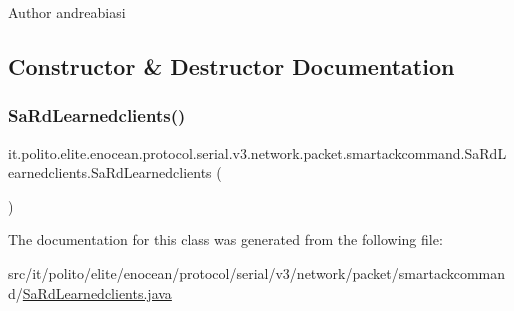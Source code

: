 \begin{DoxyAuthor}{Author}
andreabiasi 
\end{DoxyAuthor}


\subsection{Constructor \& Destructor Documentation}
\hypertarget{classit_1_1polito_1_1elite_1_1enocean_1_1protocol_1_1serial_1_1v3_1_1network_1_1packet_1_1smarta3fc26adfd93544996f2a731385cfeb74_ab4fc579aab4010d715f8e6dbd3641076}{}\label{classit_1_1polito_1_1elite_1_1enocean_1_1protocol_1_1serial_1_1v3_1_1network_1_1packet_1_1smarta3fc26adfd93544996f2a731385cfeb74_ab4fc579aab4010d715f8e6dbd3641076} 
\subsubsection{\texorpdfstring{Sa\+Rd\+Learnedclients()}{SaRdLearnedclients()}}
{\footnotesize\ttfamily it.\+polito.\+elite.\+enocean.\+protocol.\+serial.\+v3.\+network.\+packet.\+smartackcommand.\+Sa\+Rd\+Learnedclients.\+Sa\+Rd\+Learnedclients (\begin{DoxyParamCaption}{ }\end{DoxyParamCaption})}



The documentation for this class was generated from the following file\+:\begin{DoxyCompactItemize}
\item 
src/it/polito/elite/enocean/protocol/serial/v3/network/packet/smartackcommand/\hyperlink{_sa_rd_learnedclients_8java}{Sa\+Rd\+Learnedclients.\+java}\end{DoxyCompactItemize}
